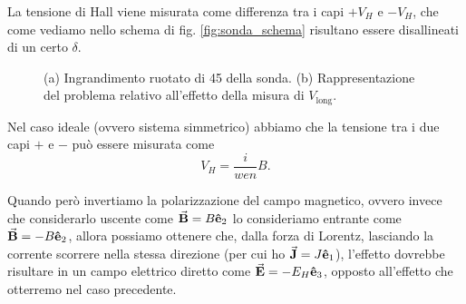 \documentclass[fleqn,varvw,preprintnumbers,citeautoscript]{memo}
\newcommand\vlong{V_\text{long}}
\begin{document}
La tensione di Hall viene misurata come differenza tra i capi $+V_H$ e $-V_H$, che come vediamo nello schema di fig. \ref{fig:sonda_schema} risultano essere disallineati di un certo $\delta$. 

\begin{figure}
    \centering
    \hspace{1cm}
    \subfloat[][]{\label{fig:sonda_schema}}
    \caption{(a) Ingrandimento ruotato di \SI{45}{\deg} della sonda. (b) Rappresentazione del problema relativo all'effetto della misura di $\vlong$.}
\end{figure}

Nel caso ideale (ovvero sistema simmetrico) abbiamo che la tensione tra i due capi $+$ e $-$ può essere misurata come \begin{equation}
    V_H = \frac{i}{wen}B. 
\end{equation} 

Quando però invertiamo la polarizzazione del campo magnetico, ovvero invece che considerarlo uscente come $\va{B} = B\vu{e}_2$ lo consideriamo entrante come $\va{B} = -B\vu{e}_2$, allora possiamo ottenere che, dalla forza di Lorentz, lasciando la corrente scorrere nella stessa direzione (per cui ho $\va{J} = J\vu{e}_1$), l'effetto dovrebbe risultare in un campo elettrico diretto come $\va{E} = -E_H \vu{e}_3$, opposto all'effetto che otterremo nel caso precedente. 
\end{document}
